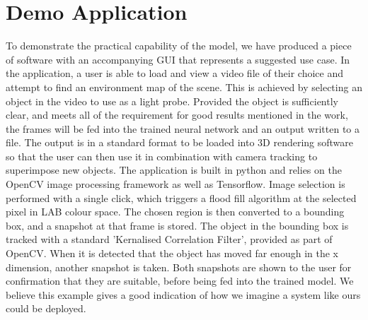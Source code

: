\documentclass[ %
                    author={Gavin Parker},
                supervisor={Dr. Neill Campbell},
                    degree={MEng},
                     title={Deep Siamese Networks for Illumination Estimation from Stereo Images},
                  subtitle={},
                      type={Research},
                      year={2018} ]{dissertation}
\begin{document}
\chapter{Demo Application}
To demonstrate the practical capability of the model, we have produced a piece of software with an accompanying GUI that represents a suggested use case. In the application, a user is able to load and view a video file of their choice and attempt to find an environment map of the scene. This is achieved by selecting an object in the video to use as a light probe. Provided the object is sufficiently clear, and meets all of the requirement for good results mentioned in the work, the frames will be fed into the trained neural network and an output written to a file. The output is in a standard format to be loaded into 3D rendering software so that the user can then use it in combination with camera tracking to superimpose new objects.
\newline
The application is built in python and relies on the OpenCV image processing framework as well as Tensorflow. Image selection is performed with a single click, which triggers a flood fill algorithm at the selected pixel in LAB colour space. The chosen region is then converted to a bounding box, and a snapshot at that frame is stored. The object in the bounding box is tracked with a standard 'Kernalised Correlation Filter', provided as part of OpenCV. When it is detected that the object has moved far enough in the x dimension, another snapshot is taken. Both snapshots are shown to the user for confirmation that they are suitable, before being fed into the trained model. We believe this example gives a good indication of how we imagine a system like ours could be deployed.
\label{appx:example}



\end{document}
